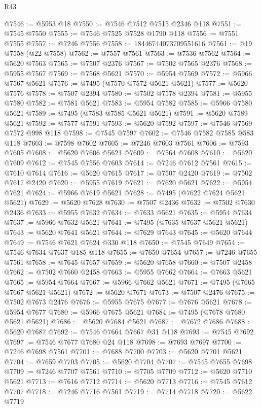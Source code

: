 \begin{lexlean}{R43}
\begin{coremodule}
@7546 := @5953 @18
@7550 := @7546 @7512 @7515 @2346 @118
@7551 := @7545 @7550
@7555 := @7546 @7525 @7528 @1790 @118
@7556 := @7551 @7555
@7557 := @7246 @7556
@7558 := 18446744073709551616
@7561 := @19 @7558 (@22 @7558)
@7562 := @7557 @7561
@7563 := @7536 @7562
@7564 := @5620 @7563
@7565 := @7507 @2376
@7567 := @7502 @7565 @2376
@7568 := @5955 @7567
@7569 := @7568 @5621
@7570 := @5954 @7569
@7572 := @5966 @7567 @5621
@7576 := @7495 (@7570 @7572 @5621 @5621)
@7577 := @5620 @7576
@7578 := @7507 @2394
@7580 := @7502 @7578 @2394
@7581 := @5955 @7580
@7582 := @7581 @5621
@7583 := @5954 @7582
@7585 := @5966 @7580 @5621
@7589 := @7495 (@7583 @7585 @5621 @5621)
@7591 := @5620 @7589 @5621
@7592 := @7577 @7591
@7593 := @5620 @7592
@7597 := @7546 @7569 @7572 @998 @118
@7598 := @7545 @7597
@7602 := @7546 @7582 @7585 @583 @118
@7603 := @7598 @7602
@7605 := @7246 @7603 @7561
@7606 := @7593 @7605
@7608 := @5620 @7606 @5621
@7609 := @7564 @7608
@7610 := @5620 @7609
@7612 := @7545 @7556 @7603
@7614 := @7246 @7612 @7561
@7615 := @7610 @7614
@7616 := @5620 @7615
@7617 := @7507 @2420
@7619 := @7502 @7617 @2420
@7620 := @5955 @7619
@7621 := @7620 @5621
@7622 := @5954 @7621
@7624 := @5966 @7619 @5621
@7628 := @7495 (@7622 @7624 @5621 @5621)
@7629 := @5620 @7628
@7630 := @7507 @2436
@7632 := @7502 @7630 @2436
@7633 := @5955 @7632
@7634 := @7633 @5621
@7635 := @5954 @7634
@7637 := @5966 @7632 @5621
@7641 := @7495 (@7635 @7637 @5621 @5621)
@7643 := @5620 @7641 @5621
@7644 := @7629 @7643
@7645 := @5620 @7644
@7649 := @7546 @7621 @7624 @330 @118
@7650 := @7545 @7649
@7654 := @7546 @7634 @7637 @185 @118
@7655 := @7650 @7654
@7657 := @7246 @7655 @7561
@7658 := @7645 @7657
@7659 := @5620 @7658
@7660 := @7507 @2458
@7662 := @7502 @7660 @2458
@7663 := @5955 @7662
@7664 := @7663 @5621
@7665 := @5954 @7664
@7667 := @5966 @7662 @5621
@7671 := @7495 (@7665 @7667 @5621 @5621)
@7672 := @5620 @7671
@7673 := @7507 @2476
@7675 := @7502 @7673 @2476
@7676 := @5955 @7675
@7677 := @7676 @5621
@7678 := @5954 @7677
@7680 := @5966 @7675 @5621
@7684 := @7495 (@7678 @7680 @5621 @5621)
@7686 := @5620 @7684 @5621
@7687 := @7672 @7686
@7688 := @5620 @7687
@7692 := @7546 @7664 @7667 @31 @118
@7693 := @7545 @7692
@7697 := @7546 @7677 @7680 @24 @118
@7698 := @7693 @7697
@7700 := @7246 @7698 @7561
@7701 := @7688 @7700
@7703 := @5620 @7701 @5621
@7704 := @7659 @7703
@7705 := @5620 @7704
@7707 := @7545 @7655 @7698
@7709 := @7246 @7707 @7561
@7710 := @7705 @7709
@7712 := @5620 @7710 @5621
@7713 := @7616 @7712
@7714 := @5620 @7713
@7716 := @7545 @7612 @7707
@7718 := @7246 @7716 @7561
@7719 := @7714 @7718
@7720 := @5622 @7719

\end{coremodule}
\end{lexlean}
